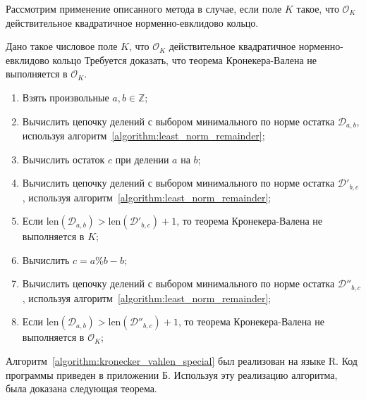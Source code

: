 \documentclass[_00_dissertation.tex]{subfiles}
\begin{document}

Рассмотрим применение описанного метода в случае, если поле $K$ такое, что $\mathcal{O}_K$ действительное квадратичное норменно-евклидово кольцо.

\begin{algorithm}\label{algorithm:kronecker_vahlen_special}
    Дано такое числовое поле $K$, что $\mathcal{O}_K$ действительное квадратичное норменно-евклидово кольцо
    Требуется доказать, что теорема Кронекера-Валена не выполняется в $\mathcal{O}_K$.

    \begin{enumerate}
        \item Взять произвольные $a, b \in \mathbb{Z}$;

        \item Вычислить цепочку делений с выбором минимального по норме остатка $\mathcal{D}_{a,b}$, используя алгоритм~\ref{algorithm:least_norm_remainder};

        \item Вычислить остаток $c$ при делении $a$ на $b$;

        \item Вычислить цепочку делений с выбором минимального по норме остатка $\mathcal{D}'_{b, c}$, используя алгоритм~\ref{algorithm:least_norm_remainder};

        \item Если $\textrm{len}(\mathcal{D}_{a, b}) > \textrm{len}(\mathcal{D}'_{b, c}) + 1$, то теорема Кронекера-Валена не выполняется в $K$;

        \item Вычислить $c = a \% b - b$;

        \item Вычислить цепочку делений с выбором минимального по норме остатка $\mathcal{D}''_{b,c}$, используя алгоритм~\ref{algorithm:least_norm_remainder};

        \item Если $\textrm{len}(\mathcal{D}_{a, b}) > \textrm{len}(\mathcal{D}''_{b, c}) + 1$, то теорема Кронекера-Валена не выполняется в $\mathcal{O}_K$;
    \end{enumerate}
\end{algorithm}

Алгоритм~\ref{algorithm:kronecker_vahlen_special} был реализован на языке R.
Код программы приведен в приложении Б.
Используя эту реализацию алгоритма, была доказана следующая теорема.
\end{document}
